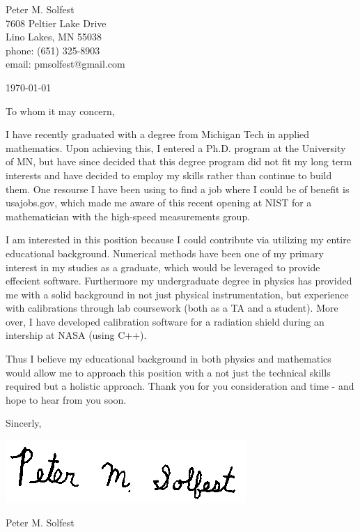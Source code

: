 \documentclass[letterpaper,12pt]{article}
\begin{document}
Peter M. Solfest\\
7608 Peltier Lake Drive\\
Lino Lakes, MN 55038\\
phone: (651) 325-8903\\
email: pmsolfest@gmail.com

\today


To whom it may concern, %

I have recently graduated with a degree from Michigan Tech in applied mathematics.
Upon achieving this, I entered a Ph.D. program at the University of MN, but have since
decided that this degree program did not fit my long term interests and have decided to
employ my skills rather than continue to build them.
One resourse I have been using to find a job where I could be of benefit is usajobs.gov,
which made me aware of this recent opening at NIST for a mathematician with the high-speed
measurements group.

I am interested in this position because I could contribute via
utilizing my entire educational background.
Numerical methods have been one of my primary interest in my studies as a graduate,
which would be leveraged to provide effecient software.
Furthermore my undergraduate degree in physics has provided me with a solid background
in not just physical instrumentation, but experience with calibrations through lab coursework
(both as a TA and a student).
More over, I have developed calibration software for a radiation shield during an intership at NASA (using C++).


Thus I believe my educational background in both physics and mathematics would allow me to approach 
this position with a not just the technical skills required but a holistic approach.
Thank you for you consideration and time - and hope to hear from you soon.

Sincerly,

\includegraphics[height=.5in]{signature.png}

Peter M. Solfest
\end{document}
